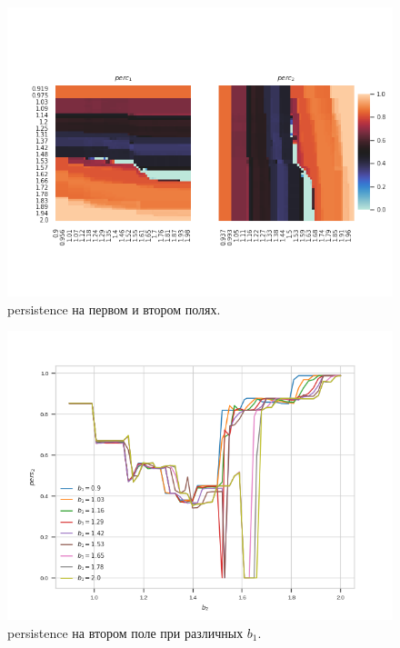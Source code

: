 \documentclass[12pt]{article}
\begin{document}
    \begin{figure}[H]
         \centering
         \includegraphics[width=0.95\columnwidth, keepaspectratio=True]{DoubleField/persistence.png}
         \caption{persistence на первом и втором полях.}
         \label{fig:persDouble}
    \end{figure}
    \begin{figure}[H]
         \centering
         \includegraphics[width=0.95\columnwidth, keepaspectratio=True]{DoubleField/somepersistence.png}
         \caption{persistence на втором поле при различных $b_1$.}
         \label{fig:somepers}
    \end{figure}
    
\end{document}
